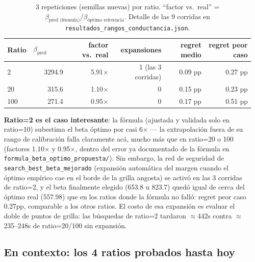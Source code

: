 \documentclass[11pt]{article}
\begin{document}
\begin{table}[htbp]
\centering
\begin{tabular}{@{}lrrrrr@{}}
\toprule
Ratio & $\beta_{\text{pred (fórmula)}}$ & factor vs.\ real & expansiones & regret medio & regret peor caso \\
\midrule
2   & 3294.9 & 5.91$\times$ & 1 (las 3 corridas) & 0.09 pp & 0.27 pp \\
20  & 315.6  & 1.10$\times$ & 0                   & 0.15 pp & 0.23 pp \\
100 & 271.4  & 0.95$\times$ & 0                   & 0.17 pp & 0.51 pp \\
\bottomrule
\end{tabular}
\caption{3 repeticiones (semillas nuevas) por ratio. ``factor vs.\ real'' =
$\beta_{\text{pred (fórmula)}}/\beta_{\text{óptimo referencia}}$. Detalle de las 9 corridas en
\texttt{resultados\_rangos\_conductancia.json}.}
\end{table}

\textbf{Ratio=2 es el caso interesante}: la fórmula (ajustada y validada solo en ratio=10)
subestima el beta óptimo por casi 6$\times$ --- la extrapolación fuera de su rango de
calibración falla claramente acá, mucho más que en ratio=20 o 100 (factores 1.10$\times$ y
0.95$\times$, dentro del error ya documentado de la fórmula en \texttt{formula\_beta\_optimo\_propuesta/}).
Sin embargo, la red de seguridad de \texttt{search\_best\_beta\_mejorado} (expansión automática
del margen cuando el óptimo empírico cae en el borde de la grilla angosta) se activó en las 3
corridas de ratio=2, y el beta finalmente elegido (653.8 u 823.7) quedó igual de cerca del
óptimo real (557.98) que en los ratios donde la fórmula no falló: regret peor caso 0.27pp,
comparable a los otros ratios. El costo de esa expansión es evaluar el doble de puntos de
grilla: las búsquedas de ratio=2 tardaron $\approx$442s contra $\approx$235--248s de ratio=20/100
sin expansión.

\subsection{En contexto: los 4 ratios probados hasta hoy}
\end{document}
